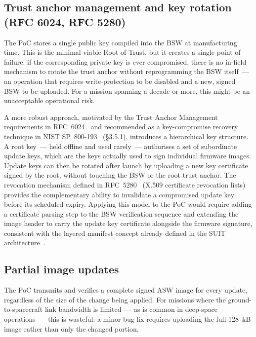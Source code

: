 \subsection{Trust anchor management and key rotation (RFC 6024, RFC 5280)}
\label{subsection:conclusion-futureWork-publicInfra}

The PoC stores a single public key compiled into the BSW at manufacturing time. This is the minimal viable Root of Trust, but it creates a single point of failure: if the corresponding private key is ever compromised, there is no in-field mechanism to rotate the trust anchor without reprogramming the BSW itself~--- an operation that requires write-protection to be disabled and a new, signed BSW to be uploaded. For a mission spanning a decade or more, this might be an unacceptable operational risk.

A more robust approach, motivated by the Trust Anchor Management requirements in RFC~6024~\cite{rfc6024} and recommended as a key-compromise recovery technique in NIST SP~800-193~\cite{NIST-sp-800-193} (\S3.5.1), introduces a hierarchical key structure. A root key~--- held offline and used rarely~--- authorises a set of subordinate update keys, which are the keys actually used to sign individual firmware images. Update keys can then be rotated after launch by uploading a new key certificate signed by the root, without touching the BSW or the root trust anchor. The revocation mechanism defined in RFC~5280~\cite{rfc5280} (X.509 certificate revocation lists) provides the complementary ability to invalidate a compromised update key before its scheduled expiry. Applying this model to the PoC would require adding a certificate parsing step to the BSW verification sequence and extending the image header to carry the update key certificate alongside the firmware signature, consistent with the layered manifest concept already defined in the SUIT architecture~\cite{rfc9019}.

\subsection{Partial image updates}
\label{subsection:conclusion-futureWork-partialUpdate}

The PoC transmits and verifies a complete signed ASW image for every update, regardless of the size of the change being applied. For missions where the ground-to-spacecraft link bandwidth is limited~--- as is common in deep-space operations~--- this is wasteful: a minor bug fix requires uploading the full 128~kB image rather than only the changed portion.

